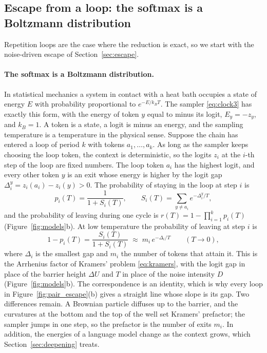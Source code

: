 \subsection{Escape from a loop: the softmax is a Boltzmann distribution}
\label{sec:loops}

Repetition loops are the case where the reduction is exact, so we start with the noise-driven escape of Section~\ref{sec:escape}.

\paragraph{The softmax is a Boltzmann distribution.} In statistical mechanics a system in contact with a heat bath occupies a state of energy $E$ with probability proportional to $e^{-E/k_BT}$. The sampler \eqref{eq:clock3} has exactly this form, with the energy of token $y$ equal to minus its logit, $E_y=-z_y$, and $k_B=1$. A token is a state, a logit is minus an energy, and the sampling temperature is a temperature in the physical sense. Suppose the chain has entered a loop of period $k$ with tokens $a_1,\dots,a_k$. As long as the sampler keeps choosing the loop token, the context is deterministic, so the logits $z_i$ at the $i$-th step of the loop are fixed numbers. The loop token $a_i$ has the highest logit, and every other token $y$ is an exit whose energy is higher by the logit gap $\Delta_i^{y}=z_i(a_i)-z_i(y)>0$. The probability of staying in the loop at step $i$ is
\begin{equation}
p_i(T)=\frac{1}{1+S_i(T)},\qquad S_i(T)=\sum_{y\neq a_i} e^{-\Delta_i^{y}/T},
\label{eq:stay}
\end{equation}
and the probability of leaving during one cycle is $r(T)=1-\prod_{i=1}^{k}p_i(T)$ (Figure~\ref{fig:models}b). At low temperature the probability of leaving at step $i$ is
\begin{equation}
1-p_i(T)=\frac{S_i(T)}{1+S_i(T)}\;\approx\;m_i\,e^{-\Delta_i/T}\qquad (T\to0),
\label{eq:boltz_exit}
\end{equation}
where $\Delta_i$ is the smallest gap and $m_i$ the number of tokens that attain it. This is the Arrhenius factor of Kramers' problem \eqref{eq:kramers}, with the logit gap in place of the barrier height $\Delta U$ and $T$ in place of the noise intensity $D$ (Figure~\ref{fig:models}b). The correspondence is an identity, which is why every loop in Figure~\ref{fig:pair_escape}(b) gives a straight line whose slope is its gap. Two differences remain. A Brownian particle diffuses up to the barrier, and the curvatures at the bottom and the top of the well set Kramers' prefactor; the sampler jumps in one step, so the prefactor is the number of exits $m_i$. In addition, the energies of a language model change as the context grows, which Section~\ref{sec:deepening} treats.




